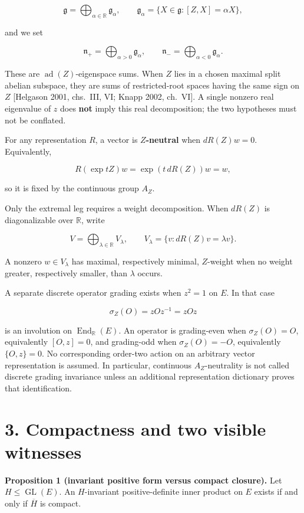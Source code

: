 \documentclass[
  10pt,
  letterpaper,
  oneside]{scrartcl}
\begin{document}
\[
\mathfrak g=\bigoplus_{\alpha\in\mathbb R}\mathfrak g_\alpha,
\qquad
\mathfrak g_\alpha=\{X\in\mathfrak g:[Z,X]=\alpha X\},
\]

and we set

\[
\mathfrak n_+=\bigoplus_{\alpha>0}\mathfrak g_\alpha,
\qquad
\mathfrak n_-=\bigoplus_{\alpha<0}\mathfrak g_\alpha.
\]

These are \(\operatorname{ad}(Z)\)-eigenspace sums. When \(Z\) lies in a
chosen maximal split abelian subspace, they are sums of restricted-root
spaces having the same sign on \(Z\) {[}Helgason 2001, chs.~III, VI;
Knapp 2002, ch.~VI{]}. A single nonzero real eigenvalue of \(z\) does
\textbf{not} imply this real decomposition; the two hypotheses must not
be conflated.

For any representation \(R\), a vector is \textbf{\(Z\)-neutral} when
\(dR(Z)w=0\). Equivalently,

\[
R(\exp tZ)w=\exp(t\,dR(Z))w=w,
\]

so it is fixed by the continuous group \(A_Z\).

Only the extremal leg requires a weight decomposition. When \(dR(Z)\) is
diagonalizable over \(\mathbb R\), write

\[
V=\bigoplus_{\lambda\in\mathbb R}V_\lambda,
\qquad
V_\lambda=\{v:dR(Z)v=\lambda v\}.
\]

A nonzero \(w\in V_\lambda\) has maximal, respectively minimal,
\(Z\)-weight when no weight greater, respectively smaller, than
\(\lambda\) occurs.

A separate discrete operator grading exists when \(z^2=1\) on \(E\). In
that case

\[
\sigma_Z(O)=zOz^{-1}=zOz
\]

is an involution on \(\operatorname{End}_{\mathbb R}(E)\). An operator
is grading-even when \(\sigma_Z(O)=O\), equivalently \([O,z]=0\), and
grading-odd when \(\sigma_Z(O)=-O\), equivalently \(\{O,z\}=0\). No
corresponding order-two action on an arbitrary vector representation is
assumed. In particular, continuous \(A_Z\)-neutrality is not called
discrete grading invariance unless an additional representation
dictionary proves that identification.

\section{3. Compactness and two visible
witnesses}\label{compactness-and-two-visible-witnesses}

\textbf{Proposition 1 (invariant positive form versus compact closure).}
Let \(H\leq\operatorname{GL}(E)\). An \(H\)-invariant positive-definite
inner product on \(E\) exists if and only if \(\overline H\) is compact.
\end{document}
